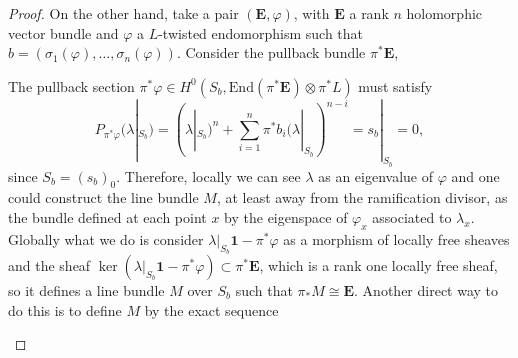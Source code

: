 \documentclass[12pt,a4paper]{book}
\theoremstyle{definition} \newtheorem{defn}[thm]{Definition}
\theoremstyle{definition} \newtheorem{ejemplo}[thm]{Example}
\theoremstyle{remark} \newtheorem{rem}[thm]{Remark}
\def\id{\mathbf{1}}
\def\End{\mathrm{End}}
\newcommand{\ve}[1]{\mathbf{#1}}
\begin{document}
\begin{proof}
	  On the other hand, take a pair $(\ve{E},\varphi)$, with $\ve{E}$ a rank $n$ holomorphic vector bundle and $\varphi$ a $L$-twisted endomorphism such that $b=(\sigma_1(\varphi),\dots,\sigma_n(\varphi))$. Consider the pullback bundle $\pi^*\ve{E}$,
	  \begin{center}
	   \end{center}
	   The pullback section $\pi^*\varphi\in H^0(S_b,\End (\pi^*\ve{E})\otimes \pi^*L)$ must satisfy
	   \begin{equation*}
	     P_{\pi^*\varphi}(\lambda|_{S_b})=(\lambda|_{S_b})^n+ \sum_{i=1}^n \pi^*b_i (\lambda|_{S_b})^{n-i} = s_b|_{S_b}=0,
	   \end{equation*}
	   since $S_b=(s_b)_0$. Therefore, locally we can see $\lambda$ as an eigenvalue of $\varphi$ and one could construct the line bundle $M$, at least away from the ramification divisor, as the bundle defined at each point $x$ by the eigenspace of $\varphi_x$ associated to $\lambda_x$. Globally what we do is consider $\lambda|_{S_b}\id - \pi^*\varphi$ as a morphism of locally free sheaves and the sheaf $\ker(\lambda|_{S_b}\id - \pi^*\varphi) \subset \pi^*\ve{E}$, which is a rank one locally free sheaf, so it defines a line bundle $M$ over $S_b$ such that $\pi_*M \cong\ve{E}$. Another direct way to do this is to define $M$ by the exact sequence
	   \begin{center}
	   \end{center}
	\end{proof}
\end{document}
